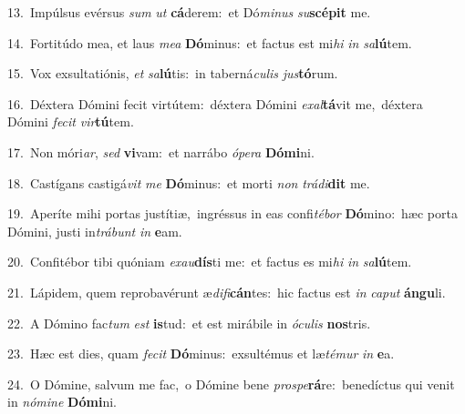 {\numbfont\textcolor{\numbcolor}{13.}}~Impúlsus evérsus \textit{sum} \textit{ut} \textbf{cá}\-derem:~\star et Dó\-\textit{mi}\-\textit{nus} \textit{su}\-\textbf{scé}\textbf{pit} me.\par
{\numbfont\textcolor{\numbcolor}{14.}}~Fortitúdo mea, et laus \textit{me}\-\textit{a} \textbf{Dó}\-minus:~\star et factus est mi\textit{hi} \textit{in} \textit{sa}\-\textbf{lú}tem.\par
{\numbfont\textcolor{\numbcolor}{15.}}~Vox exsultatiónis, \textit{et} \textit{sa}\-\textbf{lú}tis:~\star in taberná\-\textit{cu}\-\textit{lis} \textit{jus}\-\textbf{tó}rum.\par
{\numbfont\textcolor{\numbcolor}{16.}}~Déxtera Dómini fecit virtútem:~\dagger déxtera Dómini \textit{ex}\-\textit{al}\textbf{tá}vit me,~\star déxtera Dómini \textit{fe}\-\textit{cit} \textit{vir}\-\textbf{tú}tem.\par
{\numbfont\textcolor{\numbcolor}{17.}}~Non móri\-\textit{ar}\-, \textit{sed} \textbf{vi}\-vam:~\star et narrábo \textit{ó}\-\textit{pe}\textit{ra} \textbf{Dó}\-\textbf{mi}ni.\par
{\numbfont\textcolor{\numbcolor}{18.}}~Castígans castigá\textit{vit} \textit{me} \textbf{Dó}\-minus:~\star et morti \textit{non} \textit{trá}\-\textit{di}\textbf{dit} me.\par
{\numbfont\textcolor{\numbcolor}{19.}}~Aperíte mihi portas justítiæ,~\dagger ingréssus in eas confi\-\textit{té}\-\textit{bor} \textbf{Dó}\-mino:~\star hæc porta Dómini, justi in\-\textit{trá}\-\textit{bunt} \textit{in} \textbf{e}\-am.\par
{\numbfont\textcolor{\numbcolor}{20.}}~Confitébor tibi quóniam \textit{ex}\-\textit{au}\textbf{dís}ti me:~\star et factus es mi\textit{hi} \textit{in} \textit{sa}\-\textbf{lú}tem.\par
{\numbfont\textcolor{\numbcolor}{21.}}~Lápidem, quem reprobavérunt æ\-\textit{di}\-\textit{fi}\textbf{cán}tes:~\star hic factus est \textit{in} \textit{ca}\-\textit{put} \textbf{án}\-\textbf{gu}li.\par
{\numbfont\textcolor{\numbcolor}{22.}}~A Dómino fac\textit{tum} \textit{est} \textbf{is}\-tud:~\star et est mirábile in \textit{ó}\-\textit{cu}\textit{lis} \textbf{nos}\-tris.\par
{\numbfont\textcolor{\numbcolor}{23.}}~Hæc est dies, quam \textit{fe}\-\textit{cit} \textbf{Dó}\-minus:~\star exsultémus et læ\-\textit{té}\-\textit{mur} \textit{in} \textbf{e}\-a.\par
{\numbfont\textcolor{\numbcolor}{24.}}~O Dómine, salvum me fac,~\dagger o Dómine bene \textit{pro}\-\textit{spe}\textbf{rá}re:~\star benedíctus qui venit in \textit{nó}\-\textit{mi}\textit{ne} \textbf{Dó}\-\textbf{mi}ni.\par

